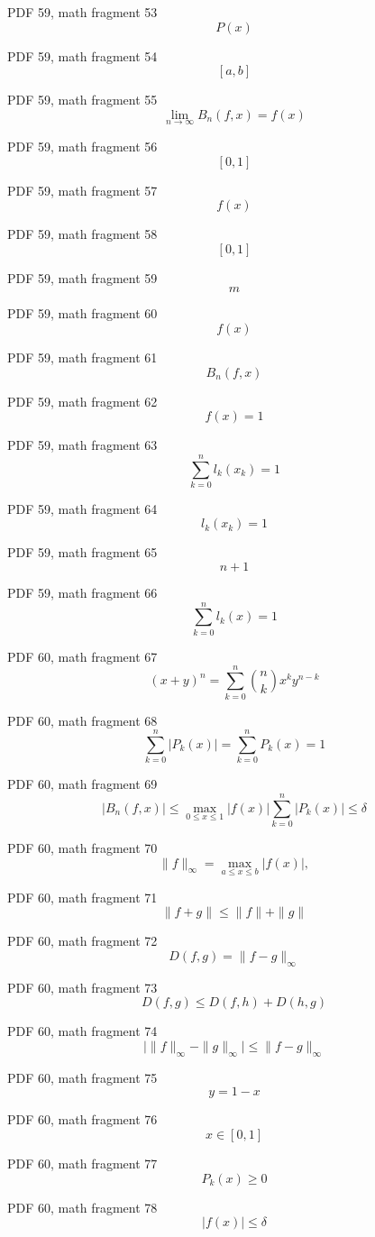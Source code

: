\documentclass[UTF8,fontset=fandol]{ctexart}
\begin{document}
PDF 59, math fragment 53
\[P(x)\]
\par
PDF 59, math fragment 54
\[[a,b]\]
\par
PDF 59, math fragment 55
\[\lim_{n \to \infty} B_{n}(f,x) = f(x)\]
\par
PDF 59, math fragment 56
\[[0,1]\]
\par
PDF 59, math fragment 57
\[f(x)\]
\par
PDF 59, math fragment 58
\[[0,1]\]
\par
PDF 59, math fragment 59
\[m\]
\par
PDF 59, math fragment 60
\[f(x)\]
\par
PDF 59, math fragment 61
\[B_{n}(f,x)\]
\par
PDF 59, math fragment 62
\[f(x)=1\]
\par
PDF 59, math fragment 63
\[\sum_{k=0}^{n}l_k(x_k)=1\]
\par
PDF 59, math fragment 64
\[l_k(x_k)=1\]
\par
PDF 59, math fragment 65
\[n+1\]
\par
PDF 59, math fragment 66
\[\sum_{k=0}^{n}l_k(x)=1\]
\par
PDF 60, math fragment 67
\[
(x+y)^n = \sum_{k=0}^{n} \binom{n}{k} x^k y^{n-k} \tag{3.1.6}
\]
\par
PDF 60, math fragment 68
\[
\sum_{k=0}^{n} |P_k(x)| = \sum_{k=0}^{n} P_k(x) = 1
\]
\par
PDF 60, math fragment 69
\[
|B_n(f,x)| \leqslant \max_{0 \leqslant x \leqslant 1} |f(x)| \sum_{k=0}^{n} |P_k(x)| \leqslant \delta
\]
\par
PDF 60, math fragment 70
\[
\|f\|_\infty = \max_{a \leqslant x \leqslant b} |f(x)| ,
\]
\par
PDF 60, math fragment 71
\[
\|f+g\| \leqslant \|f\| + \|g\| \tag{3.1.7}
\]
\par
PDF 60, math fragment 72
\[
D(f,g) = \|f-g\|_\infty \tag{3.1.8}
\]
\par
PDF 60, math fragment 73
\[
D(f,g) \leqslant D(f,h) + D(h,g) \tag{3.1.9}
\]
\par
PDF 60, math fragment 74
\[
\bigl|\|f\|_\infty - \|g\|_\infty\bigr| \leqslant \|f-g\|_\infty \tag{3.1.10}
\]
\par
PDF 60, math fragment 75
\[y=1-x\]
\par
PDF 60, math fragment 76
\[x \in [0,1]\]
\par
PDF 60, math fragment 77
\[P_k(x) \geqslant 0\]
\par
PDF 60, math fragment 78
\[|f(x)| \leqslant \delta\]
\par
\end{document}
